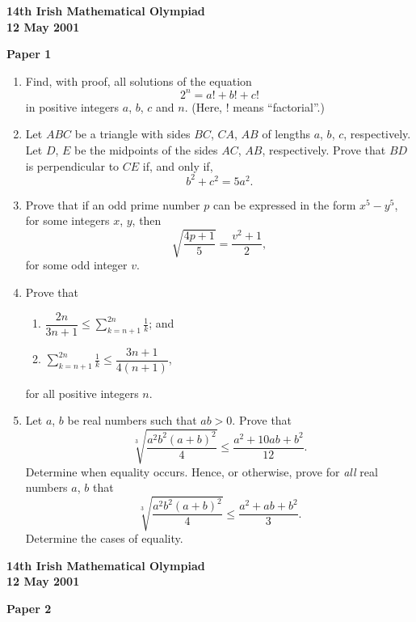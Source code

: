 \documentclass[12pt]{article}
\begin{document}
\begin{center}
{\large\bfseries 14th Irish Mathematical Olympiad\\12 May 2001}
\end{center}
\bigskip\noindent\textbf{Paper 1}\bigskip
\begin{enumerate}
\item Find, with proof, all solutions of the equation
\[
2^n = a! + b! + c!
\]
in positive integers $a$, $b$, $c$ and $n$. (Here, ! means ``factorial''.)

\item Let $ABC$ be a triangle with sides $BC$, $CA$, $AB$ of lengths $a$, $b$, $c$, respectively. Let $D$, $E$ be the midpoints of the sides $AC$, $AB$, respectively. Prove that $BD$ is perpendicular to $CE$ if, and only if,
\[
b^2 + c^2 = 5a^2.
\]

\item Prove that if an odd prime number $p$ can be expressed in the form $x^5 - y^5$, for some integers $x$, $y$, then
\[
\sqrt{\frac{4p+1}{5}} = \frac{v^2 + 1}{2},
\]
for some odd integer $v$.

\item Prove that
\begin{enumerate}
\item[(a)] $\dfrac{2n}{3n+1} \leq \displaystyle\sum_{k=n+1}^{2n} \frac{1}{k}$; \quad and
\item[(b)] $\displaystyle\sum_{k=n+1}^{2n} \frac{1}{k} \leq \dfrac{3n+1}{4(n+1)}$,
\end{enumerate}
for all positive integers $n$.

\item Let $a$, $b$ be real numbers such that $ab > 0$. Prove that
\[
\sqrt[3]{\frac{a^2 b^2 (a+b)^2}{4}} \leq \frac{a^2 + 10ab + b^2}{12}.
\]
Determine when equality occurs.
Hence, or otherwise, prove for \textit{all} real numbers $a$, $b$ that
\[
\sqrt[3]{\frac{a^2 b^2 (a+b)^2}{4}} \leq \frac{a^2 + ab + b^2}{3}.
\]
Determine the cases of equality.

\end{enumerate}
\newpage
\begin{center}
{\large\bfseries 14th Irish Mathematical Olympiad\\12 May 2001}
\end{center}
\bigskip\noindent\textbf{Paper 2}\bigskip
\end{document}
